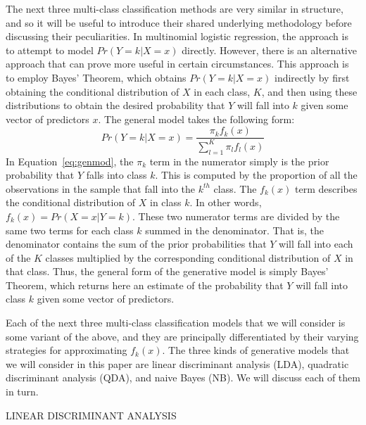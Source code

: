 \documentclass[12pt]{article}
\begin{document}
The next three multi-class classification methods are very similar in structure, 
and so it will be useful to introduce their shared underlying methodology before 
discussing their peculiarities.  In multinomial logistic regression, the approach 
is to attempt to model $Pr( Y = k|X = x)$ directly.  However, there is an 
alternative approach that can prove more useful in certain circumstances.  This 
approach is to employ Bayes' Theorem, which obtains $Pr( Y = k | X = x)$ indirectly 
by first obtaining the conditional distribution of $X$ in each class, $K$, and then 
using these distributions to obtain the desired probability that $Y$ will fall into 
$k$ given some vector of predictors $x$.  The general model takes the following form:
\begin{equation}
  \label{eq:genmod}
  Pr(Y = k | X = x) =
  \frac{\pi_k f_k(x)} {\sum_{l = 1} ^ {K} \pi_l f_l(x)}
\end{equation}
In Equation~\eqref{eq:genmod}, the $\pi_k$ term in the numerator simply is the prior 
probability that $Y$ falls into class $k$.  This is computed by the proportion of all 
the observations in the sample that fall into the $k ^ {th}$ class.  The $f_k(x)$ term 
describes the conditional distribution of $X$ in class $k$.  In other words, 
$f_k(x) = Pr(X = x | Y = k)$.  These two numerator terms are divided by the same two 
terms for each class $k$ summed in the denominator.  That is, the denominator contains 
the sum of the prior probabilities that $Y$ will fall into each of the $K$ classes 
multiplied by the corresponding conditional distribution of $X$ in that class.  Thus, 
the general form of the generative model is simply Bayes' Theorem, which returns here 
an estimate of the probability that $Y$ will fall into class $k$ given some vector of 
predictors.  

Each of the next three multi-class classification models that we will consider is some 
variant of the above, and they are principally differentiated by their varying strategies 
for approximating $f_k(x)$.  The three kinds of generative models that we will consider 
in this paper are linear discriminant analysis (LDA), quadratic discriminant analysis 
(QDA), and naive Bayes (NB).  We will discuss each of them in turn.  

LINEAR DISCRIMINANT ANALYSIS
\end{document}
